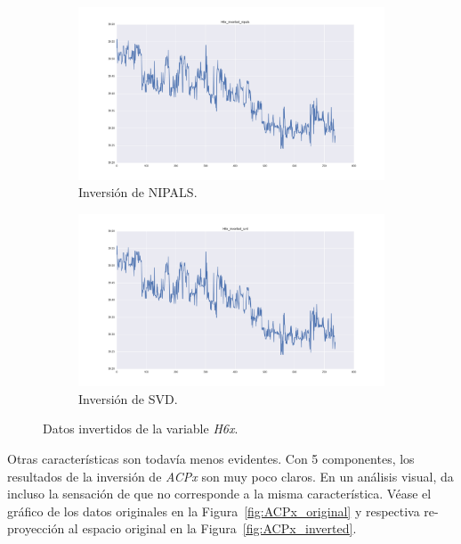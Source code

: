 \documentclass[11pt,spanish,listoffigures,listoftables]{tfgetsinf}
\begin{document}
    \begin{figure}[h]
        \centering
        \begin{subfigure}[h]{0.49\textwidth}
            \centering
            \includegraphics[width=\textwidth]{H6x_inverted_nipals.png}
            \caption{Inversión de NIPALS.}
            \label{fig:H6x_inverted_nipals}
        \end{subfigure}
        \begin{subfigure}[h]{0.49\textwidth}
            \centering
            \includegraphics[width=\textwidth]{H6x_inverted_svd.png}
            \caption{Inversión de SVD.}
            \label{fig:H6x_inverted_svd}
        \end{subfigure}
        \caption{Datos invertidos de la variable {\em H6x}.}
        \label{fig:H6x_inverted}
    \end{figure}
    
    Otras características son todavía menos evidentes. Con 5 componentes, los resultados de la inversión de {\em ACPx} son muy poco claros. En un análisis visual, da incluso la sensación de que no corresponde a la misma característica. Véase el gráfico de los datos originales en la Figura~\ref{fig:ACPx_original} y respectiva re-proyección al espacio original en la Figura~\ref{fig:ACPx_inverted}.
\end{document}
